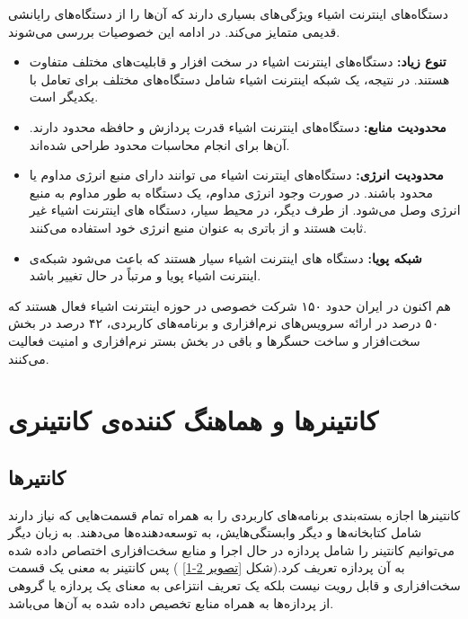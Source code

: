 \hfill

دستگاه‌های اینترنت اشیاء ویژگی‌های بسیاری دارند که آن‌ها را از دستگاه‌های رایانشی قدیمی متمایز می‌کند. در ادامه این خصوصیات بررسی می‌شوند.

\begin{itemize}
	
	\item \textbf{تنوع زیاد:} دستگاه‌های اینترنت اشیاء در سخت افزار و قابلیت‌های مختلف متفاوت هستند. در نتیجه، یک شبکه اینترنت اشیاء شامل دستگاه‌های مختلف برای تعامل با یکدیگر است.
	
	\item \textbf{محدودیت منابع:} دستگاه‌های اینترنت اشیاء قدرت پردازش و حافظه محدود دارند. آن‌ها برای انجام محاسبات محدود طراحی شده‌اند.
	
	\item \textbf{محدودیت انرژی:} دستگاه‌های اینترنت اشیاء می توانند دارای منبع انرژی مداوم یا محدود باشند. در صورت وجود انرژی مداوم، یک دستگاه به طور مداوم به منبع انرژی وصل می‌شود. از طرف دیگر، در محیط سیار، دستگاه های اینترنت اشیاء غیر ثابت هستند و از باتری به عنوان منبع انرژی خود استفاده می‌کنند.
	
	\item \textbf{شبکه پویا:} دستگاه های اینترنت اشیاء سیار هستند که باعث می‌شود شبکه‌ی اینترنت اشیاء پویا و مرتباً در حال تغییر باشد.
	
\end{itemize}

 هم اکنون در ایران حدود ۱۵۰ شرکت خصوصی در حوزه اینترنت اشیاء فعال هستند که ۵۰ درصد در ارائه سرویس‌های نرم‌افزاری و برنامه‌های کاربردی، ۴۲ درصد در بخش سخت‌افزار و ساخت حسگرها و باقی در بخش بستر نرم‌افزاری و امنیت فعالیت می‌کنند.

\section{کانتینرها و هماهنگ کننده‌ی کانتینری}

\subsection{کانتیرها}

کانتینرها اجازه بسته‌بندی برنامه‌های کاربردی را به همراه تمام قسمت‌هایی که نیاز دارند شامل کتابخانه‌ها و دیگر وابستگی‌هایش، به توسعه‌دهنده‌ها می‌دهند. به زبان دیگر می‌توانیم کانتینر را شامل پردازه در حال اجرا و منابع سخت‌افزاری اختصاص داده شده به آن پردازه تعریف کرد.(شکل
\ref{تصویر 2-1}
) پس کانتینر به معنی یک قسمت سخت‌افزاری و قابل رویت نیست بلکه یک تعریف انتزاعی به معنای یک پردازه یا گروهی از پردازه‌ها به همراه منابع تخصیص داده شده به آن‌ها می‌باشد. 

